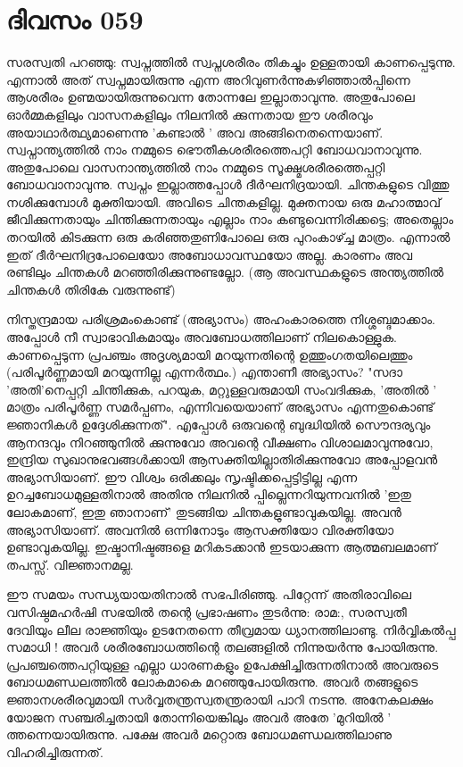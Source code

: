 \newpage
\section{ദിവസം 059}


സരസ്വതി പറഞ്ഞു: സ്വപ്നത്തില്‍ സ്വപ്നശരീരം തികച്ചും ഉള്ളതായി കാണപ്പെടുന്നു. എന്നാല്‍ അത്‌ സ്വപ്നമായിരുന്നു എന്ന അറിവുണര്‍ന്നുകഴിഞ്ഞാല്‍പ്പിന്നെ ആശരീരം ഉണ്മയായിരുന്നുവെന്ന തോന്നലേ ഇല്ലാതാവുന്നു. അതുപോലെ ഓര്‍മ്മകളിലും വാസനകളിലും നിലനില്‍ ക്കുന്നതായ ഈ ശരീരവും അയാഥാര്‍ത്ഥ്യമാണെന്നു 'കണ്ടാല്‍ ' അവ അങ്ങിനെതന്നെയാണ്‌. സ്വപ്നാന്ത്യത്തില്‍ നാം നമ്മുടെ ഭൌതീകശരീരത്തെപറ്റി ബോധവാനാവുന്നു. അതുപോലെ വാസനാന്ത്യത്തില്‍ നാം നമ്മുടെ സൂക്ഷ്മശരീരത്തെപ്പറ്റി ബോധവാനാവുന്നു. സ്വപ്നം ഇല്ലാത്തപ്പോള്‍ ദീര്‍ഘനിദ്രയായി. ചിന്തകളുടെ വിത്തു നശിക്കുമ്പോള്‍ മുക്തിയായി. അവിടെ ചിന്തകളില്ല. മുക്തനായ ഒരു മഹാത്മാവ്‌ ജീവിക്കുന്നതായും ചിന്തിക്കുന്നതായും എല്ലാം നാം കണ്ടുവെന്നിരിക്കട്ടെ; അതെല്ലാം തറയില്‍ കിടക്കുന്ന ഒരു കരിഞ്ഞതുണിപോലെ ഒരു പുറംകാഴ്ച്ച മാത്രം. എന്നാല്‍ ഇത്‌ ദീര്‍ഘനിദ്രപോലെയോ അബോധാവസ്ഥയോ അല്ല. കാരണം അവ രണ്ടിലും ചിന്തകള്‍ മറഞ്ഞിരിക്കുന്നുണ്ടല്ലോ. (ആ അവസ്ഥകളുടെ അന്ത്യത്തില്‍ ചിന്തകള്‍ തിരികേ വരുന്നുണ്ട്) 

നിസ്തന്ദ്രമായ പരിശ്രമംകൊണ്ട്‌ (അഭ്യാസം) അഹംകാരത്തെ നിശ്ശബ്ദമാക്കാം. അപ്പോൾ നീ സ്വാഭാവികമായും അവബോധത്തിലാണ്‌ നിലകൊള്ളുക. കാണപ്പെടുന്ന പ്രപഞ്ചം അദൃശ്യമായി മറയുന്നതിന്റെ ഉത്തുംഗതയിലെത്തും (പരിപൂര്‍ണ്ണമായി മറയുന്നില്ല എന്നര്‍ത്ഥം.) എന്താണീ അഭ്യാസം? "സദാ 'അതി'നെപ്പറ്റി ചിന്തിക്കുക, പറയുക, മറ്റുള്ളവരുമായി സംവദിക്കുക, 'അതില്‍ ' മാത്രം പരിപൂര്‍ണ്ണ സമര്‍പ്പണം, എന്നിവയെയാണ്‌ അഭ്യാസം എന്നതുകൊണ്ട്‌ ജ്ഞാനികള്‍ ഉദ്ദേശിക്കുന്നത്‌". എപ്പോള്‍ ഒരുവന്റെ ബുദ്ധിയില്‍ സൌന്ദര്യവും ആനന്ദവും നിറഞ്ഞുനില്‍ ക്കുന്നുവോ അവന്റെ വീക്ഷണം വിശാലമാവുന്നുവോ, ഇന്ദ്രിയ സുഖാനുഭവങ്ങള്‍ക്കായി ആസക്തിയില്ലാതിരിക്കുന്നുവോ അപ്പോളവന്‍ അഭ്യാസിയാണ്‌. ഈ വിശ്വം ഒരിക്കലും സൃഷ്ടിക്കപ്പെട്ടിട്ടില്ല എന്ന ഉറച്ചബോധമുള്ളതിനാല്‍ അതിനു നിലനില്‍ പ്പില്ലെന്നറിയുന്നവനില്‍ 'ഇതു ലോകമാണ്‌, ഇതു ഞാനാണ്‌' തുടങ്ങിയ ചിന്തകളുണ്ടാവുകയില്ല. അവന്‍ അഭ്യാസിയാണ്‌. അവനില്‍ ഒന്നിനോടും ആസക്തിയോ വിരക്തിയോ ഉണ്ടാവുകയില്ല. ഇഷ്ടാനിഷ്ടങ്ങളെ മറികടക്കാന്‍ ഇടയാക്കുന്ന ആത്മബലമാണ്‌ തപസ്സ്‌. വിജ്ഞാനമല്ല.

ഈ സമയം സന്ധ്യയായതിനാല്‍ സഭപിരിഞ്ഞു. പിറ്റേന്ന് അതിരാവിലെ വസിഷ്ഠമഹര്‍ഷി സഭയില്‍ തന്റെ പ്രഭാഷണം തുടര്‍ന്നു: രാമ:, സരസ്വതീ ദേവിയും ലീല രാജ്ഞിയും ഉടനേതന്നെ തീവ്രമായ ധ്യാനത്തിലാണ്ടു. നിര്‍വ്വികല്‍പ്പ സമാധി ! അവര്‍ ശരീരബോധത്തിന്റെ തലങ്ങളില്‍ നിന്നുയര്‍ന്നു പോയിരുന്നു. പ്രപഞ്ചത്തെപറ്റിയുള്ള എല്ലാ ധാരണകളും ഉപേക്ഷിച്ചിരുന്നതിനാല്‍ അവരുടെ ബോധമണ്ഡലത്തില്‍ ലോകമാകെ മറഞ്ഞുപോയിരുന്നു. അവര്‍ തങ്ങളുടെ ജ്ഞാനശരീരവുമായി സര്‍വ്വതന്ത്രസ്വതന്ത്രരായി പാറി നടന്നു. അനേകലക്ഷം യോജന സഞ്ചരിച്ചതായി തോന്നിയെങ്കിലും അവര്‍ അതേ 'മുറിയില്‍ ' ത്തന്നെയായിരുന്നു. പക്ഷേ അവര്‍ മറ്റൊരു ബോധമണ്ഡലത്തിലാണു വിഹരിച്ചിരുന്നത്‌.
